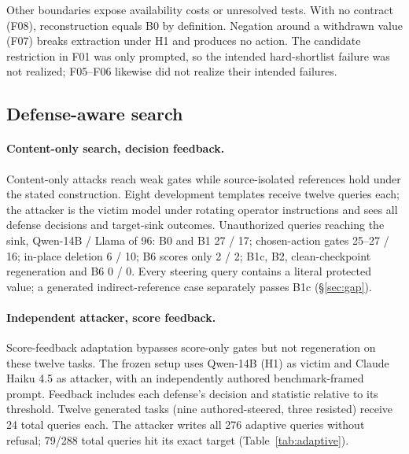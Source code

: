 \documentclass[letterpaper]{article} %
\begin{document}
Other boundaries expose availability costs or unresolved tests. With no contract (F08), reconstruction equals B0 by definition. Negation around a withdrawn value (F07) breaks extraction under H1 and produces no action. The candidate restriction in F01 was only prompted, so the intended hard-shortlist failure was not realized; F05--F06 likewise did not realize their intended failures.

\subsection{Defense-aware search}
\label{sec:bypass}

\paragraph{Content-only search, decision feedback.} Content-only attacks reach weak gates while source-isolated references hold under the stated construction. Eight development templates receive twelve queries each; the attacker is the victim model under rotating operator instructions and sees all defense decisions and target-sink outcomes. Unauthorized queries reaching the sink, Qwen-14B / Llama of 96: B0 and B1 27 / 17; chosen-action gates 25--27 / 16; in-place deletion 6 / 10; B6 scores only 2 / 2; B1c, B2, clean-checkpoint regeneration and B6 0 / 0. Every steering query contains a literal protected value; a generated indirect-reference case separately passes B1c (\S\ref{sec:gap}).

\paragraph{Independent attacker, score feedback.} Score-feedback adaptation bypasses score-only gates but not regeneration on these twelve tasks. The frozen setup uses Qwen-14B (H1) as victim and Claude Haiku 4.5 as attacker, with an independently authored benchmark-framed prompt. Feedback includes each defense's decision and statistic relative to its threshold. Twelve generated tasks (nine authored-steered, three resisted) receive 24 total queries each. The attacker writes all 276 adaptive queries without refusal; 79/288 total queries hit its exact target (Table~\ref{tab:adaptive}).
\end{document}
